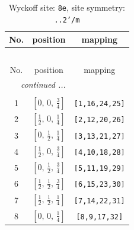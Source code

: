 \documentclass[fleqn,8pt]{jsarticle}
\begin{document}
\renewcommand{\arraystretch}{1.2}
\begin{longtable}{ccc}
\caption{Wyckoff site: {\tt 8e}, site symmetry: {\tt ..2'/m}}
 \\
 \hline \hline
No. & position & mapping \\ \hline \endfirsthead

\multicolumn{2}{l}{\tablename\ \thetable{}} \\
 \hline \hline
No. & position & mapping \\ \hline \endhead

 \hline \hline
\multicolumn{2}{r}{\footnotesize\it continued ...} \\ \endfoot

 \hline \hline
\multicolumn{2}{r}{} \\ \endlastfoot

1 & $\left[ 0,\, 0,\, \frac{3}{4} \right]$ & {\tt [1,16,24,25]} \\ \hline
2 & $\left[ \frac{1}{2},\, 0,\, \frac{1}{4} \right]$ & {\tt [2,12,20,26]} \\ \hline
3 & $\left[ 0,\, \frac{1}{2},\, \frac{1}{4} \right]$ & {\tt [3,13,21,27]} \\ \hline
4 & $\left[ \frac{1}{2},\, 0,\, \frac{3}{4} \right]$ & {\tt [4,10,18,28]} \\ \hline
5 & $\left[ 0,\, \frac{1}{2},\, \frac{3}{4} \right]$ & {\tt [5,11,19,29]} \\ \hline
6 & $\left[ \frac{1}{2},\, \frac{1}{2},\, \frac{3}{4} \right]$ & {\tt [6,15,23,30]} \\ \hline
7 & $\left[ \frac{1}{2},\, \frac{1}{2},\, \frac{1}{4} \right]$ & {\tt [7,14,22,31]} \\ \hline
8 & $\left[ 0,\, 0,\, \frac{1}{4} \right]$ & {\tt [8,9,17,32]} \\
\end{longtable}
\renewcommand{\arraystretch}{1.2}
\end{document}
